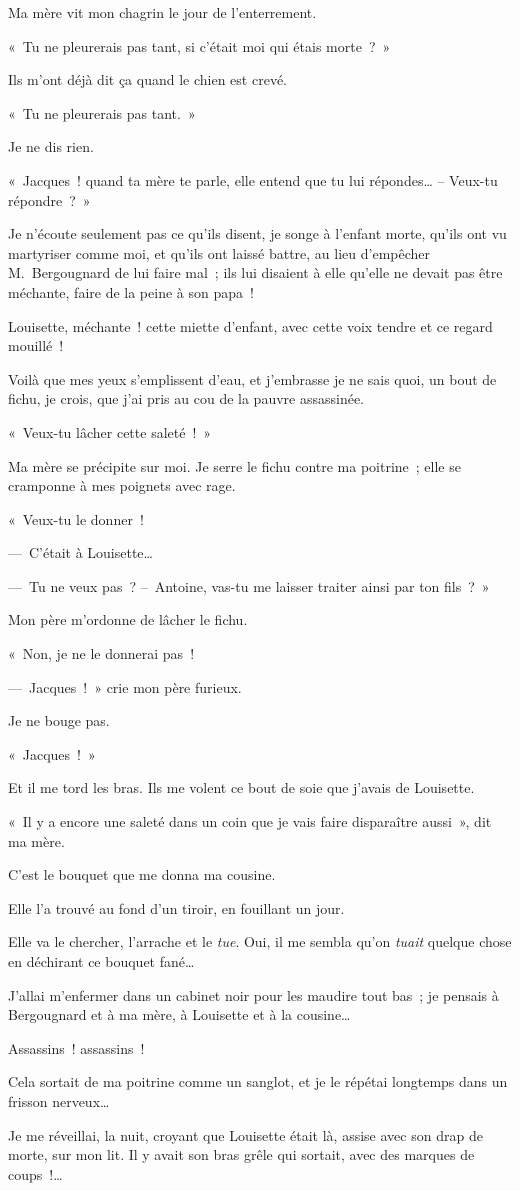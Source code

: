 \documentclass[french,twoside]{book} %
\newcommand{\astertri}{\medskip\par\centerline{\color{rubric}\large\selectfont{\syms ✻\,✻\,✻}}\medskip\par}%
\begin{document}
Ma mère vit mon chagrin le jour de l’enterrement.\par
« Tu ne pleurerais pas tant, si c’était moi qui étais morte ? »\par
Ils m’ont déjà dit ça quand le chien est crevé.\par
« Tu ne pleurerais pas tant. »\par
Je ne dis rien.\par
« Jacques ! quand ta mère te parle, elle entend que tu lui répondes… – Veux-tu répondre ? »\par
Je n’écoute seulement pas ce qu’ils disent, je songe à l’enfant morte, qu’ils ont vu martyriser comme moi, et qu’ils ont laissé battre, au lieu d’empêcher M. Bergougnard de lui faire mal ; ils lui disaient à elle qu’elle ne devait pas être méchante, faire de la peine à son papa !\par
Louisette, méchante ! cette miette d’enfant, avec cette voix tendre et ce regard mouillé !\par
Voilà que mes yeux s’emplissent d’eau, et j’embrasse je ne sais quoi, un bout de fichu, je crois, que j’ai pris au cou de la pauvre assassinée.\par
« Veux-tu lâcher cette saleté ! »\par

\astertri

\noindent Ma mère se précipite sur moi. Je serre le fichu contre ma poitrine ; elle se cramponne à mes poignets avec rage.\par
« Veux-tu le donner !\par
— C’était à Louisette…\par
— Tu ne veux pas ? – Antoine, vas-tu me laisser traiter ainsi par ton fils ? »\par
Mon père m’ordonne de lâcher le fichu.\par
« Non, je ne le donnerai pas !\par
— Jacques ! » crie mon père furieux.\par
Je ne bouge pas.\par
« Jacques ! »\par
Et il me tord les bras. Ils me volent ce bout de soie que j’avais de Louisette.\par
« Il y a encore une saleté dans un coin que je vais faire disparaître aussi », dit ma mère.\par
C’est le bouquet que me donna ma cousine.\par
Elle l’a trouvé au fond d’un tiroir, en fouillant un jour.\par
Elle va le chercher, l’arrache et le \emph{tue}. Oui, il me sembla qu’on \emph{tuait} quelque chose en déchirant ce bouquet fané…\par
J’allai m’enfermer dans un cabinet noir pour les maudire tout bas ; je pensais à Bergougnard et à ma mère, à Louisette et à la cousine…\par
Assassins ! assassins !\par
Cela sortait de ma poitrine comme un sanglot, et je le répétai longtemps dans un frisson nerveux…\par
Je me réveillai, la nuit, croyant que Louisette était là, assise avec son drap de morte, sur mon lit. Il y avait son bras grêle qui sortait, avec des marques de coups !…
\end{document}
